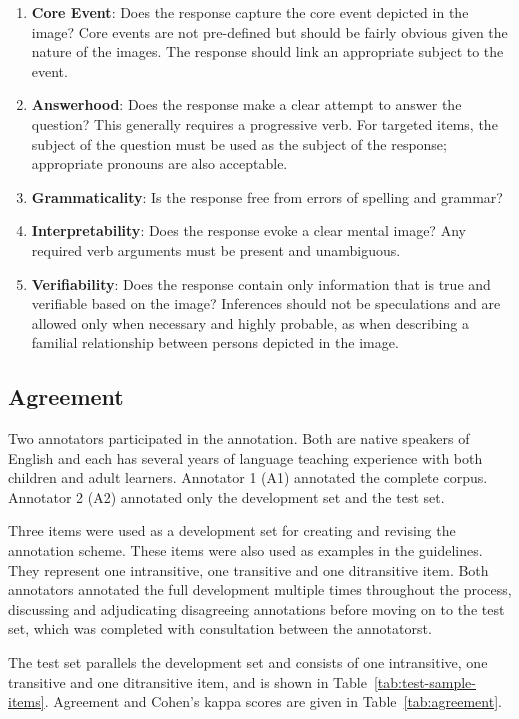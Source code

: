 \documentclass[11pt,a4paper]{article}
\begin{document}
\begin{enumerate}
\item \textbf{Core Event}: Does the response capture the core event depicted in the image? Core events are not pre-defined but should be fairly obvious given the nature of the images. The response should link an appropriate subject to the event.
\item \textbf{Answerhood}: Does the response make a clear attempt to answer the question? This generally requires a progressive verb. For targeted items, the subject of the question must be used as the subject of the response; appropriate pronouns are also acceptable.
\item \textbf{Grammaticality}: Is the response free from errors of spelling and grammar?
\item \textbf{Interpretability}: Does the response evoke a clear mental image? Any required verb arguments must be present and unambiguous.
\item \textbf{Verifiability}: Does the response contain only information that is true and verifiable based on the image? Inferences should not be speculations and are allowed only when necessary and highly probable, as when describing a familial relationship between persons depicted in the image.
\end{enumerate}

\subsection{Agreement}
Two annotators participated in the annotation. Both are native speakers of English and each has several years of language teaching experience with both children and adult learners. Annotator 1 (A1) annotated the complete corpus. Annotator 2 (A2) annotated only the development set and the test set.

Three items were used as a development set for creating and revising the annotation scheme. These items were also used as examples in the guidelines. They represent one intransitive, one transitive and one ditransitive item. Both annotators annotated the full development multiple times throughout the process, discussing and adjudicating disagreeing annotations before moving on to the test set, which was completed with consultation between the annotatorst.

The test set parallels the development set and consists of one intransitive, one transitive and one ditransitive item, and is shown in Table~\ref{tab:test-sample-items}. Agreement and Cohen's kappa scores are given in Table~\ref{tab:agreement}.
\end{document}
